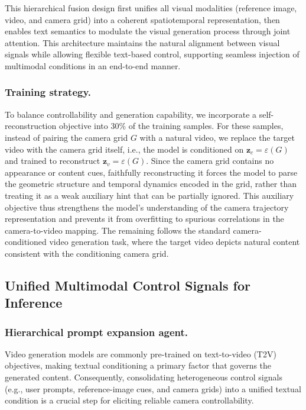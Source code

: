 \documentclass{llmxive}
\begin{document}
This hierarchical fusion design first unifies all visual modalities (reference image, video, and camera grid) into a coherent spatiotemporal representation, then enables text semantics to modulate the visual generation process through joint attention. This architecture maintains the natural alignment between visual signals while allowing flexible text-based control, supporting seamless injection of multimodal conditions in an end-to-end manner.


\subsubsection{Training strategy.}
To balance controllability and generation capability, we incorporate a
self-reconstruction objective into $30\%$ of the training samples.
For these samples, instead of pairing the camera grid $G$ with a natural
video, we replace the target video with the camera grid itself, i.e., the
model is conditioned on $\mathbf{z}_c = \varepsilon(G)$ and trained to
reconstruct $\mathbf{z}_v = \varepsilon(G)$.
Since the camera grid contains no appearance or content cues, faithfully 
reconstructing it forces the model to parse the geometric structure and
temporal dynamics encoded in the grid, rather than treating it as a weak
auxiliary hint that can be partially ignored.
This auxiliary objective thus strengthens the model's understanding of the
camera trajectory representation and prevents it from overfitting to
spurious correlations in the camera-to-video mapping.
The remaining follows the standard camera-conditioned
video generation task, where the target video depicts natural content
consistent with the conditioning camera grid.


\subsection{Unified Multimodal Control Signals for Inference}
\subsubsection{Hierarchical prompt expansion agent.}


Video generation models are commonly pre-trained on text-to-video (T2V) objectives, making textual conditioning a primary factor that governs the generated content. Consequently, consolidating heterogeneous control signals (e.g., user prompts, reference-image cues, and camera grids) into a unified textual condition is a crucial step for eliciting reliable camera controllability.
\end{document}
